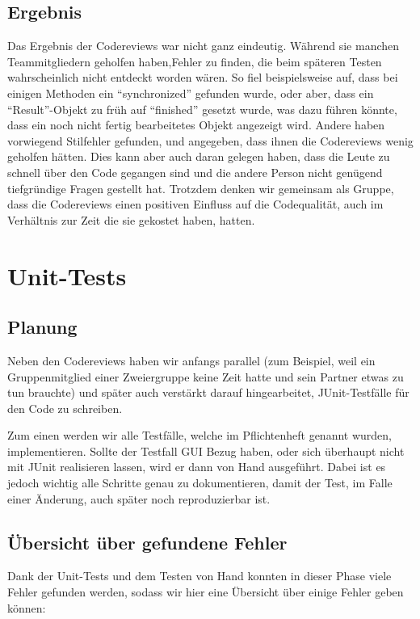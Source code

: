 \documentclass[a4paper]{scrreprt}
\begin{document}
\section{Ergebnis}
Das Ergebnis der Codereviews war nicht ganz eindeutig. Während sie manchen
Teammitgliedern  geholfen haben,Fehler zu finden, die beim späteren
Testen wahrscheinlich nicht entdeckt worden wären. So fiel beispielsweise auf, dass
bei einigen Methoden ein "`synchronized"' gefunden wurde, oder aber, dass ein
"`Result"'-Objekt zu früh auf "`finished"' gesetzt wurde, was dazu führen
könnte, dass ein noch nicht fertig bearbeitetes Objekt angezeigt wird.
Andere haben vorwiegend Stilfehler gefunden, und angegeben, dass
ihnen die Codereviews wenig geholfen hätten. Dies kann aber auch
daran gelegen haben, dass die Leute zu schnell über den Code gegangen sind und
die andere Person nicht genügend tiefgründige Fragen gestellt hat. Trotzdem
denken wir gemeinsam als Gruppe, dass die Codereviews einen positiven Einfluss
auf die Codequalität, auch im Verhältnis zur Zeit die sie gekostet haben,
hatten.

\chapter{Unit-Tests}

\section{Planung}
Neben den Codereviews haben wir anfangs parallel (zum
Beispiel, weil ein Gruppenmitglied einer Zweiergruppe keine Zeit hatte und sein
Partner etwas zu tun brauchte) und später auch
verstärkt darauf hingearbeitet, JUnit-Testfälle für den Code zu schreiben.

Zum einen werden wir alle Testfälle, welche im Pflichtenheft genannt wurden,
implementieren. Sollte der Testfall GUI Bezug haben, oder sich überhaupt nicht mit JUnit
realisieren lassen, wird er dann von Hand ausgeführt. Dabei ist es jedoch wichtig alle Schritte genau zu
dokumentieren, damit der Test, im Falle einer Änderung, auch später noch
reproduzierbar ist.

\section{Übersicht über gefundene Fehler}
Dank der Unit-Tests und dem Testen von Hand konnten in dieser Phase viele
Fehler gefunden werden, sodass wir hier eine Übersicht über einige Fehler geben können:
\end{document}
